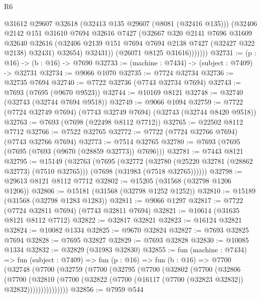 \begin{lexlean}{R6}
\begin{coremodule}
                  @31612
                  @29607
                  @32618
                  (@32413 @135 @29607 (@8081 (@32416 @135)))
                  (@32406
                    @2142
                    @151
                    @31610
                    @7694
                    @32616
                    @7427
                    (@32667
                      @320
                      @2141
                      @7696
                      @31609
                      @32640
                      @32616
                      (@32406 @2139 @151 @7694 @7694 @2138 @7427 (@32427 @322 @2138) @32431)
                      @32654)
                    @32431))
                (@26071 @8125 @31616)))))))
@32731 := (p : @16) -> (b : @16) -> @7690
@32733 := (machine : @7434) -> (subject : @7409) -> @32731
@32734 := @9066 @1070
@32735 := @7724 @32734
@32736 := @32735 @7694
@32740 := @7722 @32736 (@7743 @32734 @7694)
@32743 := @7693 (@7695 (@9670 @9523))
@32744 := @10169 @8121
@32748 := @32740 (@32743 (@32744 @7694 @9518))
@32749 := @9066 @1094
@32759 := @7722 (@7724 @32749 @7694) (@7743 @32749 @7694) (@32743 (@32744 @8420 @9518))
@32763 := @7693 (@7698 (@22498 @8112 @7712))
@32765 := @22502 @8112 @7712
@32766 := @7522 @32765
@32772 := @7722 (@7724 @32766 @7694) (@7743 @32766 @7694)
@32773 := @7514 @32765
@32780 := @7693 (@7695 (@7695 (@7693 (@9670 (@28859 @32773)) @7696)))
@32781 := @7443 @8121
@32795 := @15149
    (@32763
      (@7695
        (@32772
          (@32780 (@25220 @32781 (@28862 @32773) (@7510 @32765)))
          (@7698 (@31983 (@7518 @32765))))))
@32798 := @29613 @8121 @8112 @7712
@32802 := @15205 (@31568 (@32798 @1206 @1206))
@32806 := @15181 (@31568 (@32798 @1252 @1252))
@32810 := @15189 (@31568 (@32798 @1283 @1283))
@32811 := @9066 @1297
@32817 := @7722 (@7724 @32811 @7694) (@7743 @32811 @7694)
@32821 := @10614 (@31635 @8121 @8112 @7712)
@32822 := @32817 @32821
@32823 := @16124 @32821
@32824 := @10082 @1334
@32825 := @9670 @32824
@32827 := @7693 @32825 @7694
@32828 := @7695 @32827
@32829 := @7693 @32828
@32830 := @10085 @1334
@32832 := @32829 (@31983 @32830)
@32855 := fun (machine : @7434) =>
  fun (subject : @7409) =>
  fun (p : @16) =>
  fun (b : @16) =>
  @7700
    (@32748
      (@7700
        (@32759
          (@7700
            (@32795
              (@7700
                (@32802
                  (@7700
                    (@32806
                      (@7700
                        (@32810
                          (@7700
                            (@32822 (@7700 (@16117 (@7700 (@32823 @32832)) @32832)))))))))))))))
@32856 := @7959 @544

\end{coremodule}
\end{lexlean}

